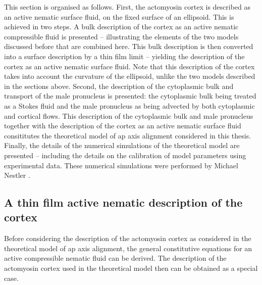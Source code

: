 This section is organised as follows. First, the actomyosin cortex is described as an active nematic surface fluid, on the fixed surface of an ellipsoid. This is achieved in two steps. A bulk description of the cortex as an active nematic compressible fluid is presented -- illustrating the elements of the two models discussed before that are combined here. This bulk description is then converted into a surface description by a thin film limit -- yielding the description of the cortex as an active nematic surface fluid. Note that this description of the cortex takes into account the curvature of the ellipsoid, unlike the two models described in the sections above. Second, the description of the cytoplasmic bulk and transport of the male pronucleus is presented: the cytoplasmic bulk being treated as a Stokes fluid \citep{niwayama2011hydrodynamic} and the male pronucleus as being advected by both cytoplasmic and cortical flows. This description of the cytoplasmic bulk and male pronucleus together with the description of the cortex as an active nematic surface fluid consititutes the theoretical model of \ac{ap} axis alignment considered in this thesis. Finally, the details of the numerical simulations of the theoretical model are presented -- including the details on the calibration of model parameters using experimental data. These numerical simulations were performed by Michael Nestler \citep{axisConvergence}.

\subsection{A thin film active nematic description of the cortex}\label{subsec:cortexModelMN}
Before considering the description of the actomyosin cortex as considered in the theoretical model of \ac{ap} axis alignment, the general constitutive equations for an active compressible nematic fluid can be derived. The description of the actomyosin cortex used in the theoretical model then can be obtained as a special case.

